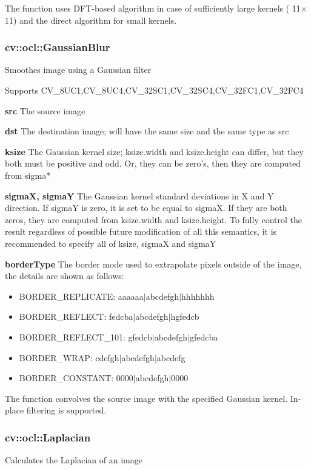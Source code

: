 \documentclass{article}
\begin{document}
The function uses DFT-based algorithm in case of sufficiently large kernels
( 11$\times $11) and the direct algorithm for small kernels.

\newpage

\subsubsection{cv::ocl::GaussianBlur}
\label{subsubsec:mylabel38}
Smoothes image using a Gaussian filter

Supports CV{\_}8UC1,CV{\_}8UC4,CV{\_}32SC1,CV{\_}32SC4,CV{\_}32FC1,CV{\_}32FC4

\textbf{src }The source image

\textbf{dst }The destination image; will have the same size and the same
type as src

\textbf{ksize }The Gaussian kernel size; ksize.width and ksize.height can
differ, but they both must be positive and odd. Or, they can be zero's, then
they are computed from sigma*

\textbf{sigmaX, sigmaY }The Gaussian kernel standard deviations in X and Y
direction. If sigmaY is zero, it is set to be equal to sigmaX. If they are
both zeros, they are computed from ksize.width and ksize.height. To fully
control the result regardless of possible future modification of all this
semantics, it is recommended to specify all of ksize, sigmaX and sigmaY

\textbf{borderType }The border mode used to extrapolate pixels outside of
the image, the details are shown as follows:

\begin{itemize}
\item BORDER{\_}REPLICATE: aaaaaa$\vert $abcdefgh$\vert $hhhhhhh
\item BORDER{\_}REFLECT: fedcba$\vert $abcdefgh$\vert $hgfedcb
\item BORDER{\_}REFLECT{\_}101: gfedcb$\vert $abcdefgh$\vert $gfedcba
\item BORDER{\_}WRAP: cdefgh$\vert $abcdefgh$\vert $abcdefg
\item BORDER{\_}CONSTANT: 0000$\vert $abcdefgh$\vert $0000
\end{itemize}

The function convolves the source image with the specified Gaussian kernel.
In-place filtering is supported.

\newpage

\subsubsection{cv::ocl::Laplacian}
\label{subsubsec:mylabel39}
Calculates the Laplacian of an image
\end{document}
